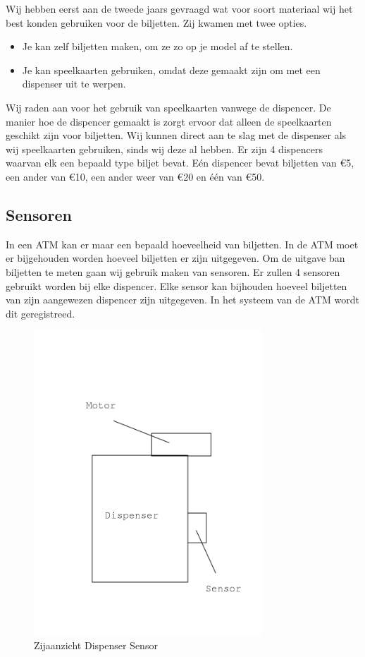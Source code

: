 \documentclass{article}
\begin{document}
Wij hebben eerst aan de tweede jaars gevraagd wat voor soort materiaal wij het best konden gebruiken voor de biljetten.
Zij kwamen met twee opties.
\begin{itemize}
\item Je kan zelf biljetten maken, om ze zo op je model af te stellen.
\item Je kan speelkaarten gebruiken, omdat deze gemaakt zijn om met een dispenser uit te werpen.
\end{itemize}

Wij raden aan voor het gebruik van speelkaarten vanwege de dispencer.
De manier hoe de dispencer gemaakt is zorgt ervoor dat alleen de speelkaarten geschikt zijn voor biljetten.
Wij kunnen direct aan te slag met de dispenser als wij speelkaarten gebruiken, sinds wij deze al hebben.
Er zijn 4 dispencers waarvan elk een bepaald type biljet bevat.
E\'en dispencer bevat biljetten van \euro{5},
een ander van \euro{10},
een ander weer van \euro{20} en \'e\'en van \euro{50}.

\newpage

\subsection{Sensoren}
In een ATM kan er maar een bepaald hoeveelheid van biljetten.
In de ATM moet er bijgehouden worden hoeveel biljetten er zijn uitgegeven.
Om de uitgave ban biljetten te meten gaan wij gebruik maken van sensoren.
Er zullen 4 sensoren gebruikt worden bij elke dispencer.
Elke sensor kan bijhouden hoeveel biljetten van zijn aangewezen dispencer zijn uitgegeven.
In het systeem van de ATM wordt dit geregistreed.

\begin{figure}[H]
	\centering
	\includegraphics[height=4.5in]{zijkantdispenser.png}
	\caption{Zijaanzicht Dispenser Sensor}
	\label{fig: Zijaanzicht Dispenser Sensor}
\end{figure}
\end{document}
